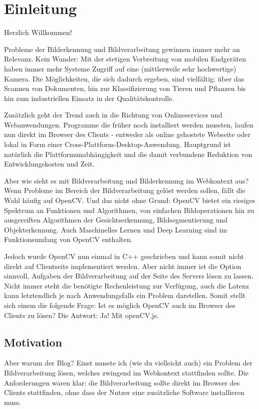 \section{Einleitung}
Herzlich Willkommen! 

Probleme der Bilderkennung und Bildverarbeitung gewinnen immer mehr an Relevanz. Kein Wunder: Mit der stetigen Verbreitung von mobilen Endgeräten haben immer mehr Systeme Zugriff auf eine (mittlerweile sehr hochwertige) Kamera. Die Möglichkeiten, die sich dadurch ergeben, sind vielfältig: über das Scannen von Dokumenten, hin zur Klassifizierung von Tieren und Pflanzen bis hin zum industriellen Einsatz in der Qualitätskontrolle.

Zusätzlich geht der Trend auch in die Richtung von Onlineservices und Webanwendungen. Programme die früher noch installiert werden mussten, laufen nun direkt im Browser des Clients - entweder als online gehostete Webseite oder lokal in Form einer Cross-Plattform-Desktop-Anwendung. Hauptgrund ist natürlich die Plattformunabhängigkeit und die damit verbundene Reduktion von Entwicklungskosten und Zeit. 

Aber wie sieht es mit Bildverarbeitung und Bilderkennung im Webkontext aus? Wenn Probleme im Bereich der Bildverarbeitung gelöst werden sollen, fällt die Wahl häufig auf OpenCV. Und das nicht ohne Grund: OpenCV bietet ein riesiges Spektrum an Funktionen und Algorithmen, von einfachen Bildoperationen hin zu ausgereiften Algorithmen der Gesichtserkennung, Bildsegmentierung und Objekterkennung. Auch Maschinelles Lernen und Deep Learning sind im Funktionsumfang von OpenCV enthalten. 

Jedoch wurde OpenCV nun einmal in C++ geschrieben und kann somit nicht direkt auf Clientseite implementiert werden. Aber nicht immer ist die Option sinnvoll, Aufgaben der Bildverarbeitung auf der Seite des Servers lösen zu lassen. Nicht immer steht die benötigte Rechenleistung zur Verfügung, auch die Latenz kann letztendlich je nach Anwendungsfalls ein Problem darstellen. Somit stellt sich einem die folgende Frage: Ist es möglich OpenCV auch im Browser des Clients zu lösen? Die Antwort: Ja! Mit openCV.js.

\subsection{Motivation}
Aber warum der Blog? Einst musste ich (wie du vielleicht auch) ein Problem der Bildverarbeitung lösen, welches zwingend im Webkontext stattfinden sollte. Die Anforderungen waren klar: die Bildverarbeitung sollte direkt im Browser des Clients stattfinden, ohne dass der Nutzer eine zusätzliche Software installieren muss. 

